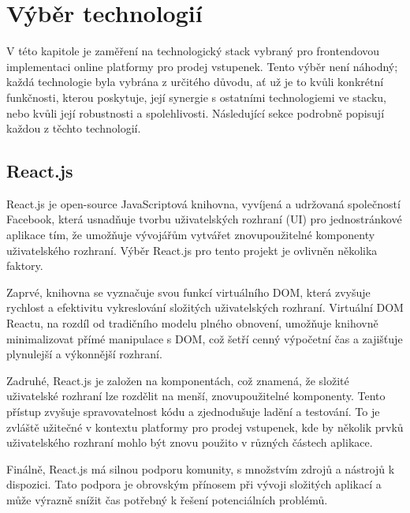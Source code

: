 \section{Výběr technologií}
\label{sec:implementace-techologie}
V této kapitole je zaměření na technologický stack vybraný pro frontendovou implementaci online platformy pro prodej vstupenek.
Tento výběr není náhodný; každá technologie byla vybrána z určitého důvodu, ať už je to kvůli konkrétní funkčnosti, kterou poskytuje, její synergie s ostatními technologiemi ve stacku, nebo kvůli její robustnosti a spolehlivosti.
Následující sekce podrobně popisují každou z těchto technologií.

\subsection{React.js}
\label{sec:implementace-techologie-react}
React.js je open-source JavaScriptová knihovna, vyvíjená a udržovaná společností Facebook, která usnadňuje tvorbu uživatelských rozhraní (UI) pro jednostránkové aplikace tím, že umožňuje vývojářům vytvářet znovupoužitelné komponenty uživatelského rozhraní.
Výběr React.js pro tento projekt je ovlivněn několika faktory.

Zaprvé, knihovna se vyznačuje svou funkcí virtuálního DOM, která zvyšuje rychlost a efektivitu vykreslování složitých uživatelských rozhraní.
Virtuální DOM Reactu, na rozdíl od tradičního modelu plného obnovení, umožňuje knihovně minimalizovat přímé manipulace s DOM, což šetří cenný výpočetní čas a zajišťuje plynulejší a výkonnější rozhraní.

Zadruhé, React.js je založen na komponentách, což znamená, že složité uživatelské rozhraní lze rozdělit na menší, znovupoužitelné komponenty.
Tento přístup zvyšuje spravovatelnost kódu a zjednodušuje ladění a testování.
To je zvláště užitečné v kontextu platformy pro prodej vstupenek, kde by několik prvků uživatelského rozhraní mohlo být znovu použito v různých částech aplikace.

Finálně, React.js má silnou podporu komunity, s množstvím zdrojů a nástrojů k dispozici.
Tato podpora je obrovským přínosem při vývoji složitých aplikací a může výrazně snížit čas potřebný k řešení potenciálních problémů.

